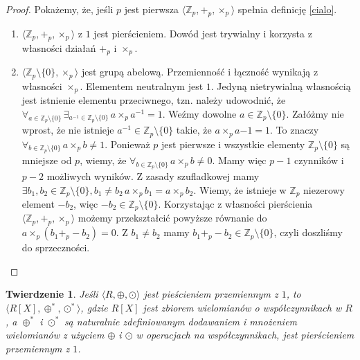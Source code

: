 \documentclass[polish,declaration,shortabstract]{iithesis}
\theoremstyle{definition}
\theoremstyle{remark} \newtheorem{observation}{Obserwacja}
\theoremstyle{plain} \newtheorem{theorem}{Twierdzenie}
\theoremstyle{plain} \newtheorem{lemma}{Lemat}
\theoremstyle{remark} \newtheorem*{remark*}{Uwaga}
\theoremstyle{reminder} \newtheorem*{reminder*}{Przypomnienie}
\begin{document}
\begin{proof}
	Pokażemy, że, jeśli $p$ jest pierwsza $\langle \mathbb{Z}_p, +_p, \times_p \rangle$ spełnia definicję \ref{cialo}.
	\begin{enumerate}[label=(\arabic*),leftmargin=.4in]
		\item $\langle \mathbb{Z}_p, +_p, \times_p \rangle$ z $1$ jest pierścieniem. Dowód jest trywialny i korzysta z własności działań $+_p$ i $\times_p$.
		\item $\langle \mathbb{Z}_p \setminus \{0\}, \times_p \rangle$ jest grupą abelową. Przemienność i łączność wynikają z własności $\times_p$. Elementem neutralnym jest $1$. Jedyną nietrywialną własnością jest istnienie elementu przeciwnego, tzn. należy udowodnić, że $\forall_{a \in \mathbb{Z}_p \setminus \{0\}} \, \exists_{a^{-1} \in \mathbb{Z}_p \setminus \{0\}} \, a \times_p a^{-1} = 1$.\newline
		      Weźmy dowolne $a \in \mathbb{Z}_p \setminus \{0\}$. Załóżmy nie wprost, że nie istnieje $a^{-1} \in \mathbb{Z}_p \setminus \{0\}$ takie, że $a \times_p a{-1} = 1$. To znaczy $\forall_{b \in \mathbb{Z}_p \setminus \{0\}} \, a \times_p b \neq 1$. Ponieważ $p$ jest pierwsze i wszystkie elementy $\mathbb{Z}_p \setminus \{0\}$ są mniejsze od $p$, wiemy, że $\forall_{b \in \mathbb{Z}_p \setminus \{0\}} \, a \times_p b \neq 0$. Mamy więc $p-1$ czynników i $p-2$ możliwych wyników. Z zasady szufladkowej mamy $\exists{b_1, b_2 \in \mathbb{Z}_p \setminus \{0\}}, b_1 \neq b_2 \, a \times_p b_1 = a \times_p b_2$. Wiemy, że istnieje w $\mathbb{Z}_p$ niezerowy element $-b_2$, więc $-b_2 \in \mathbb{Z}_p \setminus \{0\}$. Korzystając z własności pierścienia $\langle \mathbb{Z}_p, +_p, \times_p \rangle$ możemy przekształcić powyższe równanie do $a \times_p (b_1 +_p -b_2) = 0$. Z $b_1 \neq b_2$ mamy $b_1 +_p -b_2 \in \mathbb{Z}_p \setminus \{0\}$, czyli doszliśmy do sprzeczności.
	\end{enumerate}
\end{proof}

\begin{theorem}
	Jeśli $\langle R, \oplus, \odot \rangle$ jest pieścieniem przemiennym z $1$, to $\langle R[X], \oplus^{*}, \odot^{*} \rangle$, gdzie $R[X]$ jest zbiorem wielomianów o współczynnikach w $R$, a $\oplus^*$ i $\odot^*$ są naturalnie zdefiniowanym dodawaniem i mnożeniem wielomianów z użyciem $\oplus$ i $\odot$ w operacjach na współczynnikach, jest pierścieniem przemiennym z $1$.
\end{theorem}
\end{document}

